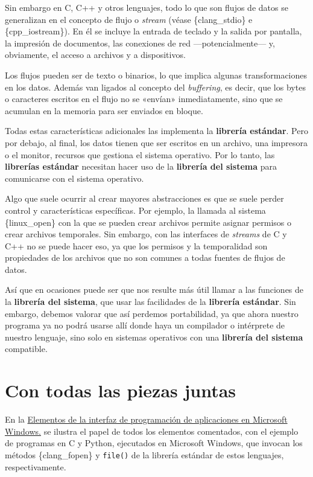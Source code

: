 Sin embargo en C, C++ y otros lenguajes, todo lo que son flujos de datos
se generalizan en el concepto de flujo o \emph{stream} (véase
\{clang\_stdio\} e \{cpp\_iostream\}). En él se incluye la entrada de
teclado y la salida por pantalla, la impresión de documentos, las
conexiones de red ---potencialmente--- y, obviamente, el acceso a
archivos y a dispositivos.

Los flujos pueden ser de texto o binarios, lo que implica algunas
transformaciones en los datos. Además van ligados al concepto del
\emph{buffering}, es decir, que los bytes o caracteres escritos en el
flujo no se «envían» inmediatamente, sino que se acumulan en la memoria
para ser enviados en bloque.

Todas estas características adicionales las implementa la
\textbf{librería estándar}. Pero por debajo, al final, los datos tienen
que ser escritos en un archivo, una impresora o el monitor, recursos que
gestiona el sistema operativo. Por lo tanto, las \textbf{librerías
estándar} necesitan hacer uso de la \textbf{librería del sistema} para
comunicarse con el sistema operativo.

Algo que suele ocurrir al crear mayores abstracciones es que se suele
perder control y características específicas. Por ejemplo, la llamada al
sistema \{linux\_open\} con la que se pueden crear archivos permite
asignar permisos o crear archivos temporales. Sin embargo, con las
interfaces de \emph{streams} de C y C++ no se puede hacer eso, ya que
los permisos y la temporalidad son propiedades de los archivos que no
son comunes a todas fuentes de flujos de datos.

Así que en ocasiones puede ser que nos resulte más útil llamar a las
funciones de la \textbf{librería del sistema}, que usar las facilidades
de la \textbf{librería estándar}. Sin embargo, debemos valorar que así
perdemos portabilidad, ya que ahora nuestro programa ya no podrá usarse
allí donde haya un compilador o intérprete de nuestro lenguaje, sino
solo en sistemas operativos con una \textbf{librería del sistema}
compatible.

\section{Con todas las piezas
juntas}\label{_con_todas_las_piezas_juntas}

En la \hyperref[fig-api-win32]{Elementos de la interfaz de programación
de aplicaciones en Microsoft Windows.} se ilustra el papel de todos los
elementos comentados, con el ejemplo de programas en C y Python,
ejecutados en Microsoft Windows, que invocan los métodos
\{clang\_fopen\} y \texttt{file()} de la librería estándar de estos
lenguajes, respectivamente.

